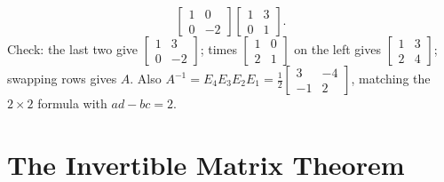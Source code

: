 \begin{example}
\[    \begin{bmatrix}1&0\\0&-2\end{bmatrix}\begin{bmatrix}1&3\\0&1\end{bmatrix}.
\]
Check: the last two give $\begin{bmatrix}1&3\\0&-2\end{bmatrix}$; times
$\begin{bmatrix}1&0\\2&1\end{bmatrix}$ on the left gives $\begin{bmatrix}1&3\\2&4\end{bmatrix}$; swapping
rows gives $A$. Also $A^{-1}=E_4E_3E_2E_1=\frac12\begin{bmatrix}3&-4\\-1&2\end{bmatrix}$, matching the
$2\times2$ formula with $ad-bc=2$.
\end{example}

\section{The Invertible Matrix Theorem}

